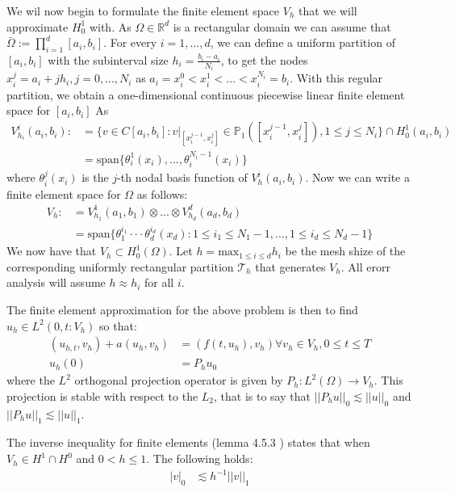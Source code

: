 We wil now begin to formulate the finite element space $V_h$ that we will approximate $H^1_0$ with.
As $\Omega \in \mathbb{R}^d$ is a rectangular domain we can assume that $\bar \Omega := \prod^d_{i=1}[a_i,b_i]$.
For every $i = 1,...,d$, we can define a uniform partition of $[a_i,b_i]$ with the subinterval size $h_i = \frac{b_i - a_i}{N_i}$,
to get the nodes $x^j_i = a_i + jh_i, j = 0,...,N_i$ as $a_i = x_i^0 < x_i^1 < ... < x_i^{N_i} = b_i$.
With this regular partition, we obtain a one-dimensional continuous piecewise linear finite element space for $[a_i,b_i]$ As
\begin{align*}
    V^i_{h_i}(a_i,b_i) :&= \{v\in C[a_i,b_i]: v|_{[x^{j-1}_i, x^j_i]}\in\mathbb{P}_1([x_i^{j-1},x_i^j]),1\leq j \leq N_i\} \cap H^1_0(a_i,b_i)\\
    &=\text{span}\{\theta^1_i(x_i), ... , \theta^{N_i-1}_i(x_i)\} 
\end{align*}
where $\theta^j_i(x_i)$ is the $j$-th nodal basis function of $V_h^i(a_i,b_i)$. 
Now we can write a finite element space for $\Omega$ as follows:
\begin{align*}
    V_h :&= V_{h_1}^1(a_1,b_1) \otimes ... \otimes V^d_{h_d}(a_d,b_d)\\
    &= \text{span}\{\theta_1^{i_1}\cdot \cdot \cdot \theta_d^{i_d}(x_d): 1 \leq i_1 \leq N_1-1,...,1\leq i_d \leq N_d-1\}
\end{align*}
We now have that $V_h\subset H^1_0(\Omega)$.
Let $h=\text{max}_{1\leq i\leq d}h_i$ be the mesh shize of the corresponding uniformly rectangular partition $\mathcal{T}_h$ that generates $V_h$.
All erorr analysis will assume $h\approx h_i$ for all $i$.

The finite element approximation for the above problem is then to find $u_h \in L^2(0,t:V_h)$ so that:
\begin{align*}
    (u_{h,t},v_h) + a(u_h,v_h) &=(f(t,u_h),v_h) \forall v_h \in V_h, 0\leq t \leq T\\
    u_h(0) &= P_hu_0
\end{align*}
where the $L^2$ orthogonal projection operator is given by $P_h:L^2(\Omega) \rightarrow V_h$.
This projection is stable with respect to the $L_2$, that is to say that $||P_hu||_0 \lesssim ||u||_0$ and $||P_hu||_1 \lesssim ||u||_1$.

The inverse inequality for finite elements (lemma 4.5.3 \cite{Brenner2008}) states that when $V_h \in H^1 \cap H^0$ and $0 < h \leq 1$.
The following holds:
\begin{align*}
    |v|_0 &\lesssim h^{-1} ||v||_1
\end{align*}

